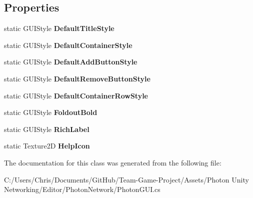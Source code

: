 \subsection*{Properties}
\begin{DoxyCompactItemize}
\item 
static G\+U\+I\+Style {\bfseries Default\+Title\+Style}\hypertarget{class_photon_g_u_i_a28c0ad75b52cffb47051b71c17bbd64c}{}\label{class_photon_g_u_i_a28c0ad75b52cffb47051b71c17bbd64c}

\item 
static G\+U\+I\+Style {\bfseries Default\+Container\+Style}\hypertarget{class_photon_g_u_i_afd35b74087a0abaea7cc82ba27ca00fb}{}\label{class_photon_g_u_i_afd35b74087a0abaea7cc82ba27ca00fb}

\item 
static G\+U\+I\+Style {\bfseries Default\+Add\+Button\+Style}\hypertarget{class_photon_g_u_i_a83d910edf7d73bc88d0f5ab02419b69a}{}\label{class_photon_g_u_i_a83d910edf7d73bc88d0f5ab02419b69a}

\item 
static G\+U\+I\+Style {\bfseries Default\+Remove\+Button\+Style}\hypertarget{class_photon_g_u_i_a4eed6f5e8cffecb56ee4baeef70d02c6}{}\label{class_photon_g_u_i_a4eed6f5e8cffecb56ee4baeef70d02c6}

\item 
static G\+U\+I\+Style {\bfseries Default\+Container\+Row\+Style}\hypertarget{class_photon_g_u_i_a7d49d3bec11154bdf80191c57eeeeea3}{}\label{class_photon_g_u_i_a7d49d3bec11154bdf80191c57eeeeea3}

\item 
static G\+U\+I\+Style {\bfseries Foldout\+Bold}\hypertarget{class_photon_g_u_i_adece5a484564c2a41da79f9a5240ae12}{}\label{class_photon_g_u_i_adece5a484564c2a41da79f9a5240ae12}

\item 
static G\+U\+I\+Style {\bfseries Rich\+Label}\hypertarget{class_photon_g_u_i_a41bd2b4e7b457cb4e0c64f07518c4d98}{}\label{class_photon_g_u_i_a41bd2b4e7b457cb4e0c64f07518c4d98}

\item 
static Texture2D {\bfseries Help\+Icon}\hypertarget{class_photon_g_u_i_af415f8882256bb26872c10e95bdfae31}{}\label{class_photon_g_u_i_af415f8882256bb26872c10e95bdfae31}

\end{DoxyCompactItemize}


The documentation for this class was generated from the following file\+:\begin{DoxyCompactItemize}
\item 
C\+:/\+Users/\+Chris/\+Documents/\+Git\+Hub/\+Team-\/\+Game-\/\+Project/\+Assets/\+Photon Unity Networking/\+Editor/\+Photon\+Network/Photon\+G\+U\+I.\+cs\end{DoxyCompactItemize}
